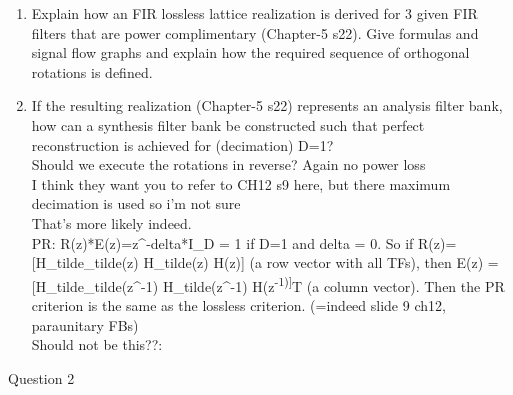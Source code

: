 \documentclass[
  a4paper,
  ,captions=tableheading
]{scrartcl}
\begin{document}
\begin{enumerate}
\def\labelenumi{\arabic{enumi}.}
\item
  Explain how an FIR lossless lattice realization is derived for 3 given
  FIR filters that are power complimentary (Chapter-5 s22). Give
  formulas and signal flow graphs and explain how the required sequence
  of orthogonal rotations is defined.
\item
  If the resulting realization (Chapter-5 s22) represents an analysis
  filter bank, how can a synthesis filter bank be constructed such that
  perfect reconstruction is achieved for (decimation) D=1?\\
  Should we execute the rotations in reverse? Again no power loss\\
  I think they want you to refer to CH12 s9 here, but there maximum
  decimation is used so i'm not sure\\
  That's more likely indeed.\\
  PR: R(z)*E(z)=z\^{}-delta*I\_D = 1 if D=1 and delta = 0. So if
  R(z)={[}H\_tilde\_tilde(z) H\_tilde(z) H(z){]} (a row vector with all
  TFs), then E(z) = {[}H\_tilde\_tilde(z\^{}-1) H\_tilde(z\^{}-1)
  H(z\textsuperscript{-1){]}}T (a column vector). Then the PR criterion
  is the same as the lossless criterion. (=indeed slide 9 ch12,
  paraunitary FBs)\\
  Should not be this??:\\
\end{enumerate}

Question 2
\end{document}
